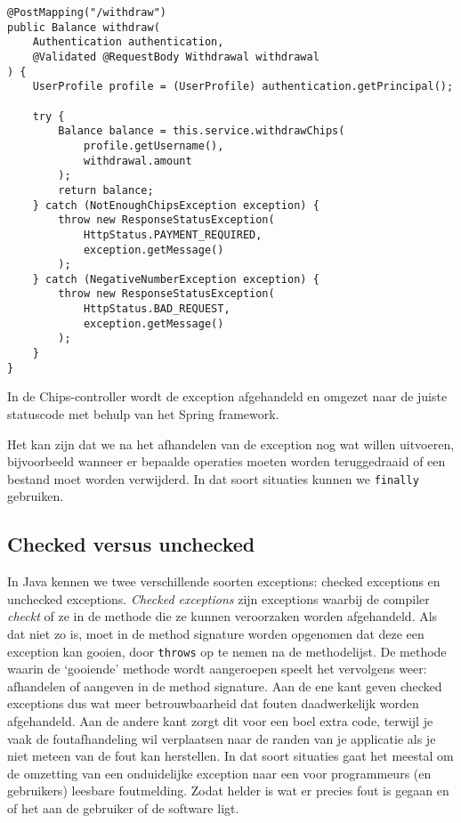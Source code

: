 \begin{listing}[H]
\begin{verbatim}
@PostMapping("/withdraw")
public Balance withdraw(
    Authentication authentication, 
    @Validated @RequestBody Withdrawal withdrawal
) {
    UserProfile profile = (UserProfile) authentication.getPrincipal();

    try {
        Balance balance = this.service.withdrawChips(
            profile.getUsername(), 
            withdrawal.amount
        );
        return balance;
    } catch (NotEnoughChipsException exception) {
        throw new ResponseStatusException(
            HttpStatus.PAYMENT_REQUIRED, 
            exception.getMessage()
        );
    } catch (NegativeNumberException exception) {
        throw new ResponseStatusException(
            HttpStatus.BAD_REQUEST, 
            exception.getMessage()
        );
    }
}
\end{verbatim}
\caption{In de Chips-controller wordt de exception afgehandeld 
en omgezet naar de juiste statuscode met behulp van het Spring framework.}
\label{code:chips-throw}
\end{listing}

Het kan zijn dat we na het afhandelen van de exception nog wat willen uitvoeren,
bijvoorbeeld wanneer er bepaalde operaties moeten worden teruggedraaid of een bestand 
moet worden verwijderd. In dat soort situaties kunnen we \texttt{finally} gebruiken.

\subsection{Checked versus unchecked}
In Java kennen we twee verschillende soorten exceptions: 
checked exceptions en unchecked exceptions.
\textit{Checked exceptions} zijn exceptions waarbij de compiler 
\textit{checkt} of ze in de methode die ze kunnen veroorzaken worden afgehandeld.
Als dat niet zo is, moet in de method signature worden opgenomen dat deze 
een exception kan gooien, door \texttt{throws} op te nemen na de methodelijst.
De methode waarin de `gooiende' methode wordt aangeroepen speelt het vervolgens weer:
afhandelen of aangeven in de method signature. Aan de ene kant geven checked exceptions 
dus wat meer betrouwbaarheid dat fouten daadwerkelijk worden afgehandeld. Aan de andere kant 
zorgt dit voor een boel extra code, terwijl je vaak de foutafhandeling wil verplaatsen 
naar de randen van je applicatie als je niet meteen van de fout kan herstellen. 
In dat soort situaties gaat het meestal om de omzetting van een onduidelijke exception 
naar een voor programmeurs (en gebruikers) leesbare foutmelding. Zodat helder is 
wat er precies fout is gegaan en of het aan de gebruiker of de software ligt.


